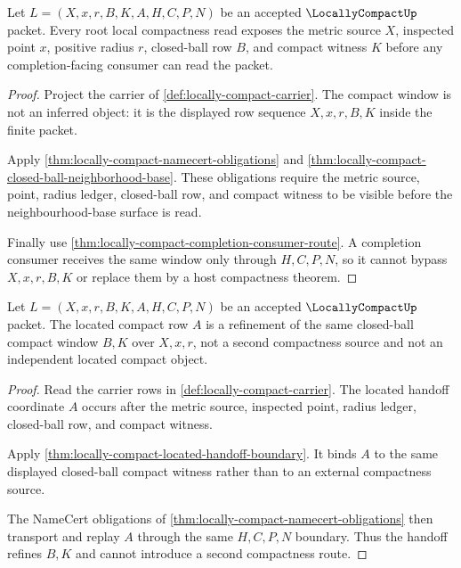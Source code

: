 \begin{theorem}\label{thm:locally-compact-compact-ball-window}
Let $L=(X,x,r,B,K,A,H,C,P,N)$ be an accepted $\LocallyCompactUp$ packet. Every root local compactness read exposes the metric source $X$, inspected point $x$, positive radius $r$, closed-ball row $B$, and compact witness $K$ before any completion-facing consumer can read the packet.
\end{theorem}
\begin{proof}
Project the carrier of \autoref{def:locally-compact-carrier}. The compact window is not an inferred object: it is the displayed row sequence $X,x,r,B,K$ inside the finite packet.

Apply \autoref{thm:locally-compact-namecert-obligations} and \autoref{thm:locally-compact-closed-ball-neighborhood-base}. These obligations require the metric source, point, radius ledger, closed-ball row, and compact witness to be visible before the neighbourhood-base surface is read.

Finally use \autoref{thm:locally-compact-completion-consumer-route}. A completion consumer receives the same window only through $H,C,P,N$, so it cannot bypass $X,x,r,B,K$ or replace them by a host compactness theorem.
\end{proof}

\begin{theorem}\label{thm:locally-compact-located-compact-route}
Let $L=(X,x,r,B,K,A,H,C,P,N)$ be an accepted $\LocallyCompactUp$ packet. The located compact row $A$ is a refinement of the same closed-ball compact window $B,K$ over $X,x,r$, not a second compactness source and not an independent located compact object.
\end{theorem}
\begin{proof}
Read the carrier rows in \autoref{def:locally-compact-carrier}. The located handoff coordinate $A$ occurs after the metric source, inspected point, radius ledger, closed-ball row, and compact witness.

Apply \autoref{thm:locally-compact-located-handoff-boundary}. It binds $A$ to the same displayed closed-ball compact witness rather than to an external compactness source.

The NameCert obligations of \autoref{thm:locally-compact-namecert-obligations} then transport and replay $A$ through the same $H,C,P,N$ boundary. Thus the handoff refines $B,K$ and cannot introduce a second compactness route.
\end{proof}

